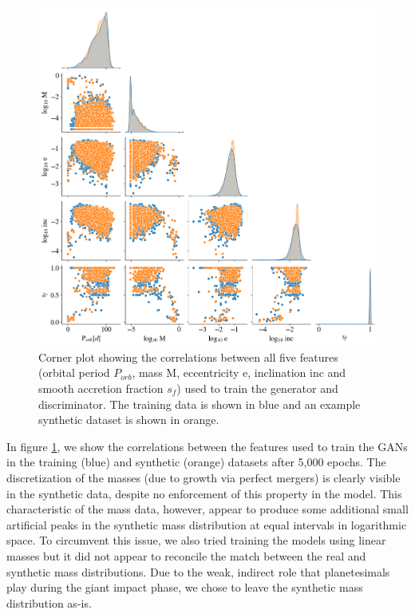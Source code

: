 \begin{figure}
\begin{center}
    \includegraphics[width=\textwidth]{figures/stip/real_syn_corner.png}
    \caption{Corner plot showing the correlations between all five features (orbital period $P_{orb}$, mass M, eccentricity e, inclination inc and smooth accretion fraction $s_{f}$) used to train the generator and discriminator. The training data is shown in blue and an example synthetic dataset is shown in orange.\label{fig:real_syn_corner}}
\end{center}
\end{figure}

In figure \ref{fig:real_syn_corner}, we show the correlations between the features used to train the GANs in the training (blue) and synthetic (orange) datasets after 5,000 epochs. The discretization of the masses (due to growth via perfect mergers) is clearly visible in the synthetic data, despite no enforcement of this property in the model. This characteristic of the mass data, however, appear to produce some additional small artificial peaks in the synthetic mass distribution at equal intervals in logarithmic space. To circumvent this issue, we also tried training the models using linear masses but it did not appear to reconcile the match between the real and synthetic mass distributions. Due to the weak, indirect role that planetesimals play during the giant impact phase, we chose to leave the synthetic mass distribution as-is.

